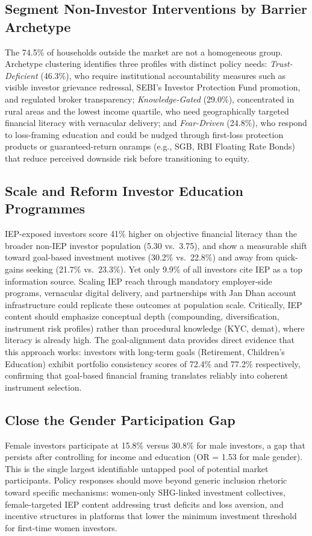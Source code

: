 \documentclass[conference]{IEEEtran}
\begin{document}
\subsection{Segment Non-Investor Interventions by Barrier Archetype}
The 74.5\% of households outside the market are not a homogeneous group. Archetype clustering identifies three profiles with distinct policy needs: \textit{Trust-Deficient} (46.3\%), who require institutional accountability measures such as visible investor grievance redressal, SEBI's Investor Protection Fund promotion, and regulated broker transparency; \textit{Knowledge-Gated} (29.0\%), concentrated in rural areas and the lowest income quartile, who need geographically targeted financial literacy with vernacular delivery; and \textit{Fear-Driven} (24.8\%), who respond to loss-framing education and could be nudged through first-loss protection products or guaranteed-return onramps (e.g., SGB, RBI Floating Rate Bonds) that reduce perceived downside risk before transitioning to equity.

\subsection{Scale and Reform Investor Education Programmes}
IEP-exposed investors score 41\% higher on objective financial literacy than the broader non-IEP investor population (5.30 vs.\ 3.75), and show a measurable shift toward goal-based investment motives (30.2\% vs.\ 22.8\%) and away from quick-gains seeking (21.7\% vs.\ 23.3\%). Yet only 9.9\% of all investors cite IEP as a top information source. Scaling IEP reach through mandatory employer-side programs, vernacular digital delivery, and partnerships with Jan Dhan account infrastructure could replicate these outcomes at population scale. Critically, IEP content should emphasize conceptual depth (compounding, diversification, instrument risk profiles) rather than procedural knowledge (KYC, demat), where literacy is already high. The goal-alignment data provides direct evidence that this approach works: investors with long-term goals (Retirement, Children's Education) exhibit portfolio consistency scores of 72.4\% and 77.2\% respectively, confirming that goal-based financial framing translates reliably into coherent instrument selection.

\subsection{Close the Gender Participation Gap}
Female investors participate at 15.8\% versus 30.8\% for male investors, a gap that persists after controlling for income and education (OR = 1.53 for male gender). This is the single largest identifiable untapped pool of potential market participants. Policy responses should move beyond generic inclusion rhetoric toward specific mechanisms: women-only SHG-linked investment collectives, female-targeted IEP content addressing trust deficits and loss aversion, and incentive structures in platforms that lower the minimum investment threshold for first-time women investors.
\end{document}

